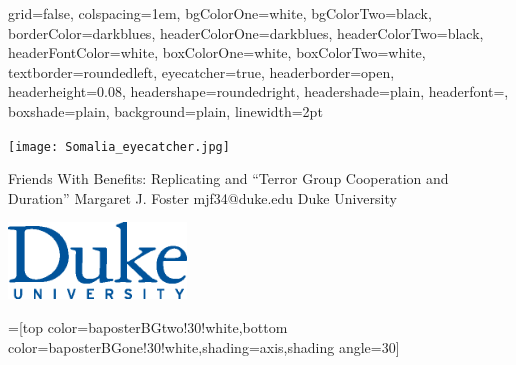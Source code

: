\documentclass[paperwidth = 42in, paperheight = 36in, landscape,final]{baposter}
\begin{document}
\begin{poster}{
  grid=false,
  colspacing=1em,
  bgColorOne=white, %
  bgColorTwo=black, %
  borderColor=darkblues, %
  headerColorOne=darkblues, %
  headerColorTwo=black, %
  headerFontColor=white, %
  boxColorOne=white,
  boxColorTwo=white,
  textborder=roundedleft,
  eyecatcher=true,
  headerborder=open,
  headerheight=0.08\textheight,
  headershape=roundedright,
  headershade=plain,
  headerfont=\large\textsc, %
  boxshade=plain,
  background=plain,
  linewidth=2pt
  }
  {\begin{minipage}{13em}
    \texttt{[image: Somalia\_eyecatcher.jpg]}
  \end{minipage}} %
  {\sc %
  Friends With Benefits: Replicating and ``Terror Group Cooperation
  and Duration''}
  {\sc %
  \vspace{.5em} Margaret J. Foster\hspace{3em}
mjf34@duke.edu\hspace{3em}
  Duke University
  }
  {{\begin{minipage}{13em}
    \hfill
    \includegraphics[height=5.5em]{dukelogo_vert_pms287.eps}
  \end{minipage}}
  }

  =[top color=baposterBGtwo!30!white,bottom color=baposterBGone!30!white,shading=axis,shading angle=30]

     \newlength{\leftimgwidth}
     \setlength{\leftimgwidth}{0.78em+8.0em}

    \newcommand{\colouredcircle}[1]{%
      \tikz{\useasboundingbox (-0.2em,-0.32em) rectangle(0.2em,0.32em); \draw[draw=black,fill=baposterBGone!80!black!#1!white,line width=0.03em] (0,0) circle(0.18em);}}


\end{poster}
\end{document}
